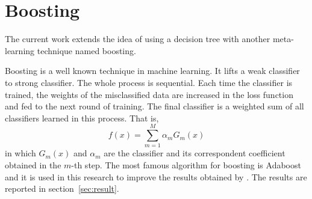 \documentclass{edm_template}
\begin{document}

\section{Boosting}

The current work extends the idea of using a decision tree with another meta-learning technique named boosting.

Boosting is a well known technique in machine learning. It lifts a weak classifier to strong classifier. The whole process is sequential. Each time the classifier is trained, the weights of the misclassified data are increased in the loss function and fed to the next round of training. The final classifier is a weighted sum of all classifiers learned in this process. That is,
$$ f(x)=\sum\limits_{m=1}^M\alpha_mG_m(x)$$
in which $G_m(x)$ and $\alpha_m$  are the classifier and its correspondent coefficient obtained in the $m$-th step. The most famous algorithm for boosting is Adaboost \cite{freund1997decision} and it is used in this research to improve the results obtained by . The results are reported in section~\ref{sec:result}.
\end{document}
